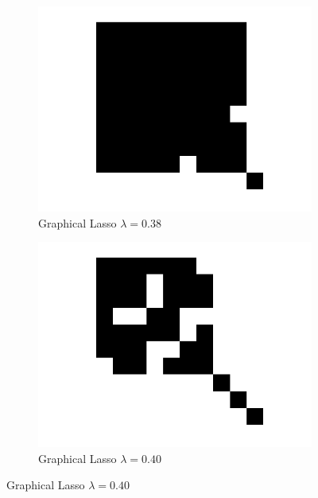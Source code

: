 \documentclass{article}
\begin{document}
\begin{enumerate}
\begin{figure}[ht!]
\begin{subfigure}{.5\textwidth}
  \centering
  \includegraphics[width=.8\linewidth]{glasso_0_38.png}
  \caption{Graphical Lasso $\lambda=0.38$}
\end{subfigure}%
\begin{subfigure}{.5\textwidth}
  \centering
  \includegraphics[width=.8\linewidth]{glasso_0_40.png}
  \caption{Graphical Lasso $\lambda=0.40$}
\end{subfigure}


\end{figure}
\end{enumerate}
\end{document}
